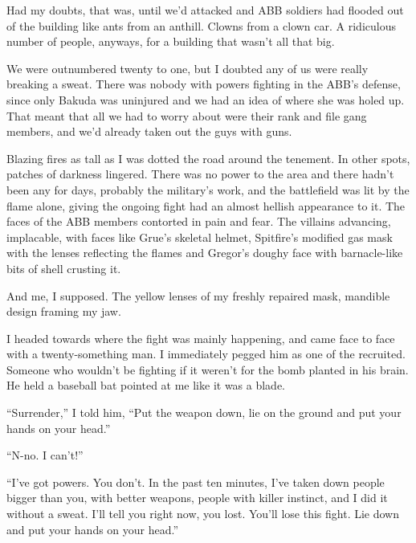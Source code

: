 Had my doubts, that was, until we'd attacked and ABB soldiers had flooded out of the building like ants from an anthill.  Clowns from a clown car.  A ridiculous number of people, anyways, for a building that wasn't all that big.



We were outnumbered twenty to one, but I doubted any of us were really breaking a sweat.  There was nobody with powers fighting in the ABB's defense, since only Bakuda was uninjured and we had an idea of where she was holed up.  That meant that all we had to worry about were their rank and file gang members, and we'd already taken out the guys with guns.



Blazing fires as tall as I was dotted the road around the tenement.  In other spots, patches of darkness lingered.  There was no power to the area and there hadn't been any for days, probably the military's work, and the battlefield was lit by the flame alone, giving the ongoing fight had an almost hellish appearance to it.  The faces of the ABB members contorted in pain and fear.  The villains advancing, implacable, with faces like Grue's skeletal helmet, Spitfire's modified gas mask with the lenses reflecting the flames and Gregor's doughy face with barnacle-like bits of shell crusting it.



And me, I supposed.  The yellow lenses of my freshly repaired mask, mandible design framing my jaw.



I headed towards where the fight was mainly happening, and came face to face with a twenty-something man.  I immediately pegged him as one of the recruited.  Someone who wouldn't be fighting if it weren't for the bomb planted in his brain.  He held a baseball bat pointed at me like it was a blade.



``Surrender,'' I told him, ``Put the weapon down, lie on the ground and put your hands on your head.''



``N-no.  I can't!''



``I've got powers.  You don't.  In the past ten minutes, I've taken down people bigger than you, with better weapons, people with killer instinct, and I did it without a sweat.  I'll tell you right now, you lost.  You'll lose this fight.  Lie down and put your hands on your head.''



